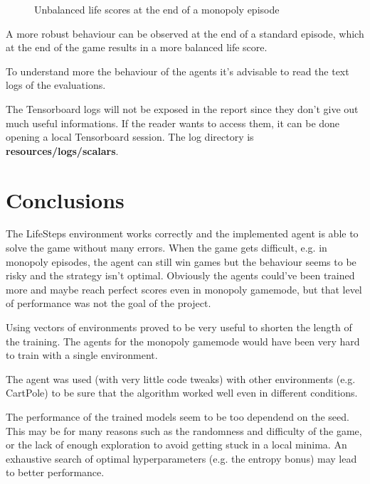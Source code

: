 \documentclass{article}
\begin{document}
\begin{figure}
  \centering
  \caption{Unbalanced life scores at the end of a monopoly episode}
  \label{fig:F}
\end{figure}

A more robust behaviour can be observed at the end of a standard episode, which at the end of the game results in a more balanced life score. 

To understand more the behaviour of the agents it's advisable to read the text logs of the evaluations.

The Tensorboard logs will not be exposed in the report since they don't give out much useful informations. If the reader wants to access them, it can be done opening a local Tensorboard session. The log directory is \textbf{resources/logs/scalars}.

\section{Conclusions}

The LifeSteps environment works correctly and the implemented agent is able to solve the game without many errors. When the game gets difficult, e.g. in monopoly episodes, the agent can still win games but the behaviour seems to be risky and the strategy isn't optimal. Obviously the agents could've been trained more and maybe reach perfect scores even in monopoly gamemode, but that level of performance was not the goal of the project. 

Using vectors of environments proved to be very useful to shorten the length of the training. The agents for the monopoly gamemode would have been very hard to train with a single environment. 

The agent was used (with very little code tweaks) with other environments (e.g. CartPole) to be sure that the algorithm worked well even in different conditions. 

The performance of the trained models seem to be too dependend on the seed. This may be for many reasons such as the randomness and difficulty of the game, or the lack of enough exploration to avoid getting stuck in a local minima. An exhaustive search of optimal hyperparameters (e.g. the entropy bonus) may lead to better performance.
\end{document}

